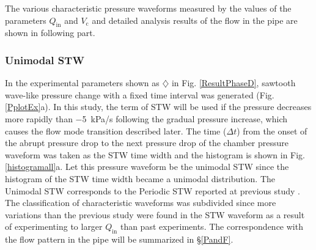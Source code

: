 \documentclass[aps,pre,preprint,groupedaddress,showkeys]{revtex4-2}
\begin{document}
The various characteristic pressure waveforms measured by the values of the parameters $Q_\mathrm{in}$ and $V_ \mathrm{c}$ and detailed analysis results of the flow in the pipe are shown in following part.

\subsubsection{Unimodal STW}
In the experimental parameters shown as $\diamondsuit$  in Fig. \ref{ResultPhaseD}, sawtooth wave-like pressure change with a fixed time interval was generated (Fig. \ref{PplotEx}a).
In this study, the term of STW will be used if the pressure decreases more rapidly than \SI{-5}{kPa/s} following the gradual pressure increase, which causes the flow mode transition described later.
The time ($\Delta t$) from the onset of the abrupt pressure drop to the next pressure drop of the chamber pressure waveform was taken as the STW time width and the histogram is shown in Fig. \ref {histogramall}a.
Let this pressure waveform be the unimodal STW since the histogram of the STW time width became a unimodal distribution.
The Unimodal STW corresponds to the Periodic STW reported at previous study \citep{kanno2018}.
The classification of characteristic waveforms was subdivided since more variations than the previous study were found in the STW waveform as a result of experimenting to larger $Q_\mathrm{in}$ than past experiments.
The correspondence with the flow pattern in the pipe will be summarized in \S \ref{PandF}.
\end{document}
